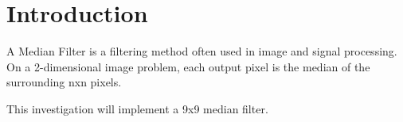 \section{Introduction}
A Median Filter is a filtering method often used in image and signal processing. On a 2-dimensional image problem, each output pixel is the median of the surrounding nxn pixels.

This investigation will implement a 9x9 median filter.

